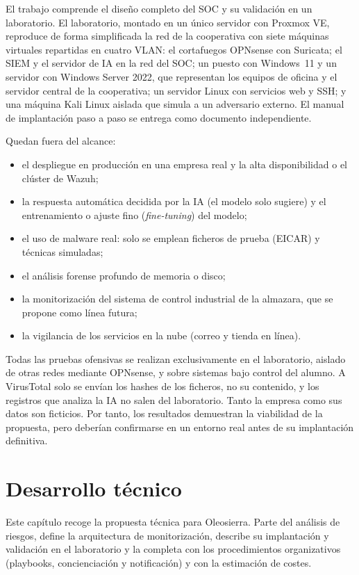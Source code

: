 \documentclass[11pt,a4paper,oneside]{report}
\begin{document}
El trabajo comprende el diseño completo del SOC y su validación en un laboratorio. El laboratorio, montado en un único servidor con Proxmox VE, reproduce de forma simplificada la red de la cooperativa con siete máquinas virtuales repartidas en cuatro VLAN: el cortafuegos OPNsense con Suricata; el SIEM y el servidor de IA en la red del SOC; un puesto con Windows~11 y un servidor con Windows Server 2022, que representan los equipos de oficina y el servidor central de la cooperativa; un servidor Linux con servicios web y SSH; y una máquina Kali Linux aislada que simula a un adversario externo. El manual de implantación paso a paso se entrega como documento independiente.

Quedan fuera del alcance:
\begin{itemize}
  \item el despliegue en producción en una empresa real y la alta disponibilidad o el clúster de Wazuh;
  \item la respuesta automática decidida por la IA (el modelo solo sugiere) y el entrenamiento o ajuste fino (\emph{fine-tuning}) del modelo;
  \item el uso de malware real: solo se emplean ficheros de prueba (EICAR) y técnicas simuladas;
  \item el análisis forense profundo de memoria o disco;
  \item la monitorización del sistema de control industrial de la almazara, que se propone como línea futura;
  \item la vigilancia de los servicios en la nube (correo y tienda en línea).
\end{itemize}

Todas las pruebas ofensivas se realizan exclusivamente en el laboratorio, aislado de otras redes mediante OPNsense, y sobre sistemas bajo control del alumno. A VirusTotal solo se envían los hashes de los ficheros, no su contenido, y los registros que analiza la IA no salen del laboratorio. Tanto la empresa como sus datos son ficticios. Por tanto, los resultados demuestran la viabilidad de la propuesta, pero deberían confirmarse en un entorno real antes de su implantación definitiva.

\chapter{Desarrollo técnico}

Este capítulo recoge la propuesta técnica para Oleosierra. Parte del análisis de riesgos, define la arquitectura de monitorización, describe su implantación y validación en el laboratorio y la completa con los procedimientos organizativos (playbooks, concienciación y notificación) y con la estimación de costes.
\end{document}
